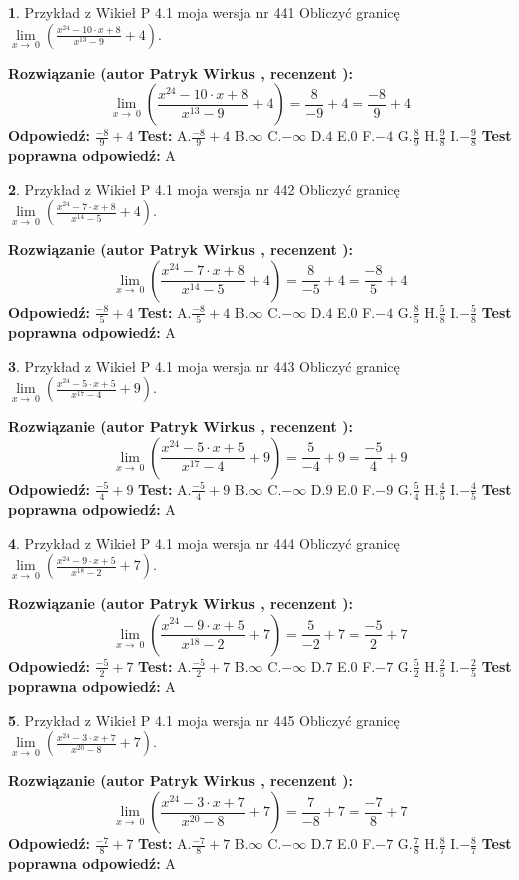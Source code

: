 \documentclass[12pt, a4paper]{article}
\theoremstyle{definition} %
\newtheorem{zad}{}
\newcommand{\zadStart}[1]{\begin{zad}#1\newline}
\newcommand{\zadStop}{\end{zad}}
\newcommand{\rozwStart}[2]{\noindent \textbf{Rozwiązanie (autor #1 , recenzent #2): }\newline}
\newcommand{\rozwStop}{\newline}
\newcommand{\odpStart}{\noindent \textbf{Odpowiedź:}\newline}
\newcommand{\odpStop}{\newline}
\newcommand{\testStart}{\noindent \textbf{Test:}\newline}
\newcommand{\testStop}{\newline}
\newcommand{\kluczStart}{\noindent \textbf{Test poprawna odpowiedź:}\newline}
\newcommand{\kluczStop}{\newline}
\begin{document}
\zadStart{Przykład z Wikieł P 4.1 moja wersja nr 441}
Obliczyć granicę $\lim\limits_{x\to\ 0}(\frac{x^{24}-10 \cdot x +8}{x^{13}-9}+4)$.
\zadStop
\rozwStart{Patryk Wirkus}{}
$$\lim\limits_{x\to\ 0}(\frac{x^{24}-10 \cdot x +8}{x^{13}-9}+4)=\frac{8}{-9}+4=\frac{-8}{9}+4$$
\rozwStop
\odpStart
$\frac{-8}{9}+4$
\odpStop
\testStart
A.$\frac{-8}{9}+4$
B.$\infty$
C.$-\infty$
D.$4$
E.$0$
F.$-4$
G.$\frac{8}{9}$
H.$\frac{9}{8}$
I.$-\frac{9}{8}$
\testStop
\kluczStart
A
\kluczStop



\zadStart{Przykład z Wikieł P 4.1 moja wersja nr 442}
Obliczyć granicę $\lim\limits_{x\to\ 0}(\frac{x^{24}-7 \cdot x +8}{x^{14}-5}+4)$.
\zadStop
\rozwStart{Patryk Wirkus}{}
$$\lim\limits_{x\to\ 0}(\frac{x^{24}-7 \cdot x +8}{x^{14}-5}+4)=\frac{8}{-5}+4=\frac{-8}{5}+4$$
\rozwStop
\odpStart
$\frac{-8}{5}+4$
\odpStop
\testStart
A.$\frac{-8}{5}+4$
B.$\infty$
C.$-\infty$
D.$4$
E.$0$
F.$-4$
G.$\frac{8}{5}$
H.$\frac{5}{8}$
I.$-\frac{5}{8}$
\testStop
\kluczStart
A
\kluczStop



\zadStart{Przykład z Wikieł P 4.1 moja wersja nr 443}
Obliczyć granicę $\lim\limits_{x\to\ 0}(\frac{x^{24}-5 \cdot x +5}{x^{17}-4}+9)$.
\zadStop
\rozwStart{Patryk Wirkus}{}
$$\lim\limits_{x\to\ 0}(\frac{x^{24}-5 \cdot x +5}{x^{17}-4}+9)=\frac{5}{-4}+9=\frac{-5}{4}+9$$
\rozwStop
\odpStart
$\frac{-5}{4}+9$
\odpStop
\testStart
A.$\frac{-5}{4}+9$
B.$\infty$
C.$-\infty$
D.$9$
E.$0$
F.$-9$
G.$\frac{5}{4}$
H.$\frac{4}{5}$
I.$-\frac{4}{5}$
\testStop
\kluczStart
A
\kluczStop



\zadStart{Przykład z Wikieł P 4.1 moja wersja nr 444}
Obliczyć granicę $\lim\limits_{x\to\ 0}(\frac{x^{24}-9 \cdot x +5}{x^{18}-2}+7)$.
\zadStop
\rozwStart{Patryk Wirkus}{}
$$\lim\limits_{x\to\ 0}(\frac{x^{24}-9 \cdot x +5}{x^{18}-2}+7)=\frac{5}{-2}+7=\frac{-5}{2}+7$$
\rozwStop
\odpStart
$\frac{-5}{2}+7$
\odpStop
\testStart
A.$\frac{-5}{2}+7$
B.$\infty$
C.$-\infty$
D.$7$
E.$0$
F.$-7$
G.$\frac{5}{2}$
H.$\frac{2}{5}$
I.$-\frac{2}{5}$
\testStop
\kluczStart
A
\kluczStop



\zadStart{Przykład z Wikieł P 4.1 moja wersja nr 445}
Obliczyć granicę $\lim\limits_{x\to\ 0}(\frac{x^{24}-3 \cdot x +7}{x^{20}-8}+7)$.
\zadStop
\rozwStart{Patryk Wirkus}{}
$$\lim\limits_{x\to\ 0}(\frac{x^{24}-3 \cdot x +7}{x^{20}-8}+7)=\frac{7}{-8}+7=\frac{-7}{8}+7$$
\rozwStop
\odpStart
$\frac{-7}{8}+7$
\odpStop
\testStart
A.$\frac{-7}{8}+7$
B.$\infty$
C.$-\infty$
D.$7$
E.$0$
F.$-7$
G.$\frac{7}{8}$
H.$\frac{8}{7}$
I.$-\frac{8}{7}$
\testStop
\kluczStart
A
\kluczStop
\end{document}
